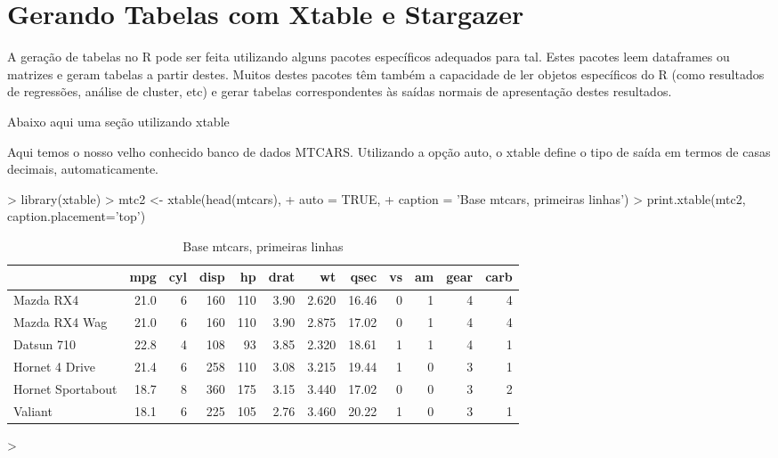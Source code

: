 \documentclass[12pt,a4paper,oneside]{erdc}
\begin{document}
\section{Gerando Tabelas com Xtable e Stargazer}
	
	A geração de tabelas no R pode ser feita utilizando alguns pacotes específicos adequados para tal. Estes pacotes leem dataframes ou matrizes e geram tabelas a partir destes. Muitos destes pacotes têm também a capacidade de ler objetos específicos do R (como resultados de regressões, análise de cluster, etc) e gerar tabelas correspondentes às saídas normais de apresentação destes resultados.
	

		
		Abaixo aqui uma seção utilizando xtable
		
		
Aqui temos o nosso velho conhecido banco de dados MTCARS. Utilizando a opção auto, o xtable define o tipo de saída em termos de casas decimais, automaticamente.

\begin{Schunk}
\begin{Sinput}
> library(xtable)
> mtc2 <- xtable(head(mtcars), 
+        	auto = TRUE, 
+        	caption = 'Base mtcars, primeiras linhas')
> print.xtable(mtc2, caption.placement='top')
\end{Sinput}
\begin{table}[ht]
\centering
\caption{Base mtcars, primeiras linhas} 
\begin{tabular}{lrrrrrrrrrrr}
  \hline
 & mpg & cyl & disp & hp & drat & wt & qsec & vs & am & gear & carb \\ 
  \hline
Mazda RX4 & 21.0 & 6 & 160 & 110 & 3.90 & 2.620 & 16.46 & 0 & 1 & 4 & 4 \\ 
  Mazda RX4 Wag & 21.0 & 6 & 160 & 110 & 3.90 & 2.875 & 17.02 & 0 & 1 & 4 & 4 \\ 
  Datsun 710 & 22.8 & 4 & 108 & 93 & 3.85 & 2.320 & 18.61 & 1 & 1 & 4 & 1 \\ 
  Hornet 4 Drive & 21.4 & 6 & 258 & 110 & 3.08 & 3.215 & 19.44 & 1 & 0 & 3 & 1 \\ 
  Hornet Sportabout & 18.7 & 8 & 360 & 175 & 3.15 & 3.440 & 17.02 & 0 & 0 & 3 & 2 \\ 
  Valiant & 18.1 & 6 & 225 & 105 & 2.76 & 3.460 & 20.22 & 1 & 0 & 3 & 1 \\ 
   \hline
\end{tabular}
\end{table}\begin{Sinput}
> 		
\end{Sinput}
\end{Schunk}
		
\end{document}
